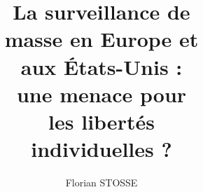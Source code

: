 \title{La surveillance de \\masse en Europe et \\aux
\'Etats-Unis :\\ \newline une menace pour \\les libertés \\individuelles ?}

\author{Florian STOSSE}